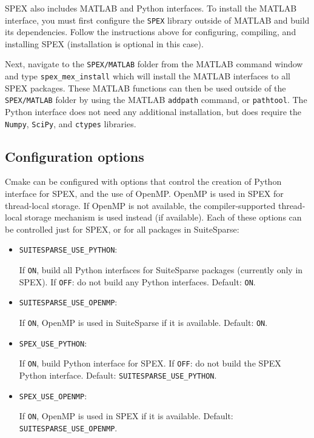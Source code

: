 \documentclass[12pt,oneside]{book}
\theoremstyle{definition}
\begin{document}
SPEX also includes MATLAB and Python interfaces. 
To install the MATLAB interface, you must first configure the \verb'SPEX' library outside of
MATLAB and build its dependencies.  Follow the instructions above for configuring, compiling,
and installing SPEX (installation is optional in this case).

Next,
navigate to the \verb|SPEX/MATLAB| folder from the MATLAB command window and type
\verb|spex_mex_install| which will install the MATLAB interfaces to all SPEX packages.
These MATLAB functions can then be used outside of the \verb|SPEX/MATLAB| folder by using the 
MATLAB \verb'addpath' command, or \verb'pathtool'. The Python interface does not need any additional installation, but does require the \texttt{Numpy}, \texttt{SciPy}, and \texttt{ctypes} libraries. 

\subsection{Configuration options}

Cmake can be configured with options that control the creation of Python
interface for SPEX, and the use of OpenMP.  OpenMP is used in SPEX for
thread-local storage. If OpenMP is not available, the compiler-supported thread-local
storage mechanism is used instead (if available).  Each of these options can be
controlled just for SPEX, or for all packages in SuiteSparse:

\begin{itemize}

\item \verb`SUITESPARSE_USE_PYTHON`:

      If \verb`ON`, build all Python interfaces for SuiteSparse packages
        (currently only in SPEX).
      If \verb`OFF`: do not build any Python interfaces.
      Default: \verb`ON`.

\item \verb`SUITESPARSE_USE_OPENMP`:

      If \verb`ON`, OpenMP is used in SuiteSparse if it is available.
      Default: \verb`ON`.

\item \verb`SPEX_USE_PYTHON`:

      If \verb`ON`, build Python interface for SPEX.
      If \verb`OFF`: do not build the SPEX Python interface.
      Default: \verb`SUITESPARSE_USE_PYTHON`.

\item \verb`SPEX_USE_OPENMP`:

  If \verb`ON`, OpenMP is used in SPEX if it is available.
  Default: \verb`SUITESPARSE_USE_OPENMP`.

\end{itemize}
\end{document}
